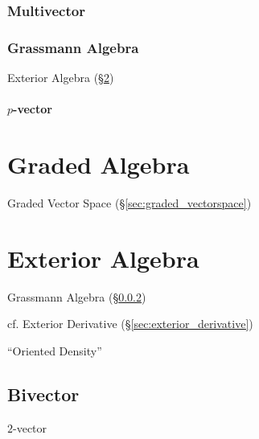 \subsubsection{Multivector}\label{sec:multivector}\hfill

\subsubsection{Grassmann Algebra}\label{sec:grassmann_algebra}

Exterior Algebra (\S\ref{sec:exterior_algebra})

\paragraph{$p$-vector}\label{sec:p_vector}\hfill



\section{Graded Algebra}\label{sec:graded_algebra}

Graded Vector Space (\S\ref{sec:graded_vectorspace})



\section{Exterior Algebra}\label{sec:exterior_algebra}


Grassmann Algebra (\S\ref{sec:grassmann_algebra})

\fist cf. Exterior Derivative (\S\ref{sec:exterior_derivative}) %

``Oriented Density'' %



\subsection{Bivector}\label{sec:bivector}

$2$-vector

